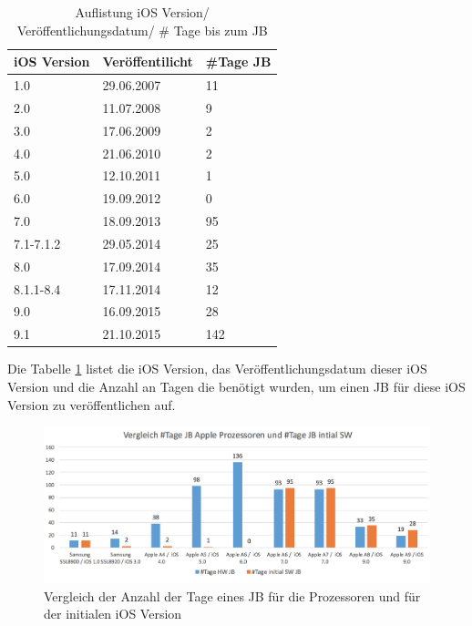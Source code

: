 \begin{table}[htp!]
    \begin{center}
        \begin{tabular}{|l|l|l|} \hline
         \textbf{iOS Version} & \textbf{Veröffentilicht} & \textbf{\#Tage JB}\\ \hline    
        1.0 & 29.06.2007 & 11\\ \hline 
        2.0 & 11.07.2008	& 9\\ \hline 
        3.0 & 17.06.2009	& 2\\ \hline 
        4.0 & 21.06.2010 & 2\\ \hline 
        5.0 & 12.10.2011	& 1\\ \hline 
        6.0 & 19.09.2012	& 0\\ \hline 
        7.0 & 18.09.2013	& 95\\ \hline 
        7.1-7.1.2 & 29.05.2014 & 25\\ \hline 
        8.0 & 17.09.2014	& 35\\ \hline 
        8.1.1-8.4 & 17.11.2014	& 12\\ \hline 
        9.0 & 16.09.2015	& 28\\ \hline
        9.1 & 21.10.2015	& 142\\ \hline 
        \end{tabular} 
        \caption{Auflistung iOS Version/ Veröffentlichungsdatum/ \# Tage bis zum JB}
        \label{tab:iOSVersion}
    \end{center}
\end{table}

Die Tabelle \ref{tab:iOSVersion} listet die iOS Version, das Veröffentlichungsdatum dieser iOS Version und die Anzahl an Tagen die benötigt wurden, um einen JB für diese iOS Version zu veröffentlichen auf.   
\begin{figure}[htbp]
        \centering
                \includegraphics[scale=0.55]{Bilder/iDeviceJB-SW-HW.png}
         \caption{Vergleich der Anzahl der Tage eines JB für die Prozessoren und für der initialen iOS Version}
        \label{fig:VergleichJBProzessorSW}      
\end{figure}

